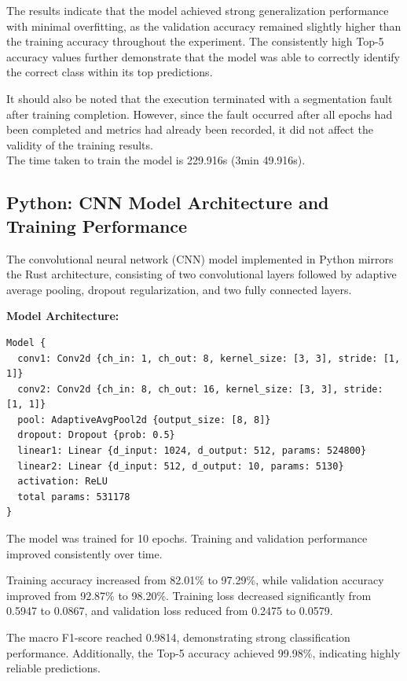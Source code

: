 \documentclass{ieeeaccess}
\begin{document}
The results indicate that the model achieved strong generalization performance with minimal overfitting, as the validation accuracy remained slightly higher than the training accuracy throughout the experiment. The consistently high Top-5 accuracy values further demonstrate that the model was able to correctly identify the correct class within its top predictions.

It should also be noted that the execution terminated with a segmentation fault after training completion. However, since the fault occurred after all epochs had been completed and metrics had already been recorded, it did not affect the validity of the training results. \\

The time taken to train the model is 229.916s (3min 49.916s).



\subsection{Python: CNN Model Architecture and Training Performance}

The convolutional neural network (CNN) model implemented in Python mirrors the Rust architecture, consisting of two convolutional layers followed by adaptive average pooling, dropout regularization, and two fully connected layers.

\textbf{Model Architecture:}

\begin{lstlisting}
Model {
  conv1: Conv2d {ch_in: 1, ch_out: 8, kernel_size: [3, 3], stride: [1, 1]}
  conv2: Conv2d {ch_in: 8, ch_out: 16, kernel_size: [3, 3], stride: [1, 1]}
  pool: AdaptiveAvgPool2d {output_size: [8, 8]}
  dropout: Dropout {prob: 0.5}
  linear1: Linear {d_input: 1024, d_output: 512, params: 524800}
  linear2: Linear {d_input: 512, d_output: 10, params: 5130}
  activation: ReLU
  total params: 531178
}
\end{lstlisting}

The model was trained for 10 epochs. Training and validation performance improved consistently over time.

Training accuracy increased from 82.01\% to 97.29\%, while validation accuracy improved from 92.87\% to 98.20\%. 
Training loss decreased significantly from 0.5947 to 0.0867, and validation loss reduced from 0.2475 to 0.0579.

The macro F1-score reached 0.9814, demonstrating strong classification performance. Additionally, the Top-5 accuracy achieved 99.98\%, indicating highly reliable predictions.
\end{document}
